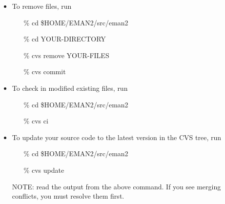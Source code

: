 \begin{itemize}
  \item To remove files, run
    \begin{itemize} 
      \item[\%] cd \$HOME/EMAN2/src/eman2
      \item[\%] cd YOUR-DIRECTORY
      \item[\%] cvs remove YOUR-FILES
      \item[\%] cvs commit
    \end{itemize}

  \item To check in modified existing files, run
    \begin{itemize} 
      \item[\%] cd \$HOME/EMAN2/src/eman2
      \item[\%] cvs ci
    \end{itemize}

  \item To update your source code to the latest version in the CVS tree, run
    \begin{itemize} 
      \item[\%] cd \$HOME/EMAN2/src/eman2
      \item[\%] cvs update
    \end{itemize}
     NOTE: read the output from the above command. If you see merging conflicts, you must resolve them first.


\end{itemize}